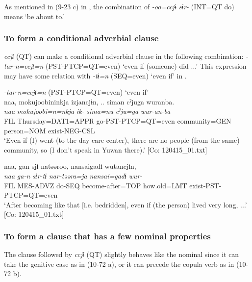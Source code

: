 As mentioned in (9-23 c) in , the combination of \textit{{}-oo=ccjɨ sɨr-} (INT=QT do) means ‘be about to.’

\subsubsection{To form a conditional adverbial clause}\label{sec:10.4.1.4}

\textit{ccjɨ} (QT) can make a conditional adverbial clause in the following combination: \textit{{}-tar-n=ccjɨ=n} (PST-PTCP=QT=even) ‘even if (someone) did ...’ This expression may have some relation with \textit{{}-tɨ=n} (SEQ=even) ‘even if’ in .

\ea\label{ex:10.71}   \textit{{}-tar-n=ccjɨ=n} (PST-PTCP=QT=even) ‘even if’\\
  \ea  %
      \glll    naa,  {\textbar}mokujoobi{\textbar}ninkja  izjancjɨn, ..  siman  cˀjuga  wuranba.\\
      \textit{naa}  \textit{mokujoobi=n=nkja}  \textit{ik-}  \textit{sima=nu}  \textit{cˀju=ga}  \textit{wur-an-ba}\\
      FIL  Thursday=DAT1=APPR  go-PST-PTCP=QT=even  community=GEN person=NOM  exist-NEG-CSL\\
      \glt       ‘Even if (I) went (to the day-care center), there are no people (from the same) community, so (I don’t speak in Yuwan there).’ [Co: 120415\_01.txt]

  \ex  %
      \glll    naa,  gan  sjɨ  natəəroo,  {\textbar}nansai{\textbar}gadɨ  wutancjɨn,\\
      \textit{naa}  \textit{ga-n}  \textit{sɨr-tɨ}  \textit{nar-təəra=ja}  \textit{nansai=gadɨ}  \textit{wur-}\\
      FIL  MES-ADVZ  do-SEQ  become-after=TOP  how.old=LMT   exist-PST-PTCP=QT=even\\
      \glt       ‘After becoming like that [i.e. bedridden], even if (the person) lived very long, ...’ [Co: 120415\_01.txt]
    \z
\z

\subsubsection{To form a clause that has a few nominal properties}\label{sec:10.4.1.5}

The clause followed by \textit{ccjɨ} (QT) slightly behaves like the nominal since it can take the genitive case as in (10-72 a), or it can precede the copula verb as in (10-72 b).

